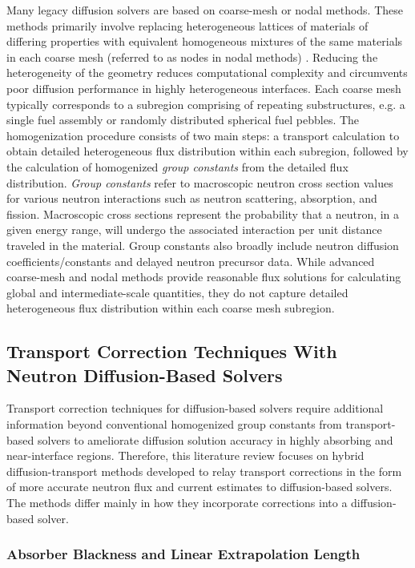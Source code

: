 Many legacy diffusion solvers are based on coarse-mesh or nodal methods. These methods
primarily involve replacing heterogeneous lattices of materials of differing properties with
equivalent homogeneous mixtures of the same materials in each coarse mesh (referred to as nodes in
nodal methods) \cite{stacey_nuclear_2007}. Reducing the heterogeneity of the geometry reduces
computational complexity and circumvents poor diffusion performance in highly heterogeneous
interfaces. Each coarse mesh typically corresponds to a subregion comprising of repeating
substructures, e.g. a single fuel assembly or randomly distributed spherical fuel pebbles. The
homogenization procedure consists of two main steps: a transport calculation to obtain detailed
heterogeneous flux distribution within each subregion, followed by the calculation of homogenized
\textit{group constants} from the detailed flux distribution. \textit{Group constants} refer to
macroscopic neutron cross section values for various neutron interactions such as neutron
scattering, absorption, and fission. Macroscopic cross sections represent the probability that a
neutron, in a given energy range, will undergo the associated interaction per unit distance
traveled in the material. Group constants also broadly include neutron diffusion
coefficients/constants and delayed neutron precursor data. While advanced coarse-mesh and nodal
methods provide reasonable flux solutions for calculating global and intermediate-scale quantities,
they do not capture detailed heterogeneous flux distribution within each coarse mesh subregion.

\subsection{Transport Correction Techniques With Neutron Diffusion-Based Solvers}

Transport correction techniques for diffusion-based solvers require additional information beyond
conventional homogenized group constants from transport-based solvers to ameliorate diffusion
solution accuracy in highly absorbing and near-interface regions.
Therefore, this literature review focuses on hybrid diffusion-transport methods developed to relay
transport corrections in the form of more accurate neutron flux and current estimates to
diffusion-based solvers. The methods differ mainly in how they incorporate corrections into a
diffusion-based solver.

\subsubsection{Absorber Blackness and Linear Extrapolation Length}

